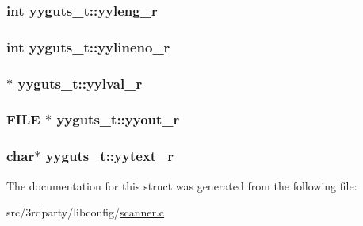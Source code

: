 \label{structyyguts__t_a21f81ca100b12364a5095a37d1c6f650}
\hypertarget{structyyguts__t_aba739bc731f0e9cbb0b6bdfca7930ebd}{
\subsubsection[{yyleng\_\-r}]{\setlength{\rightskip}{0pt plus 5cm}int {\bf yyguts\_\-t::yyleng\_\-r}}}
\label{structyyguts__t_aba739bc731f0e9cbb0b6bdfca7930ebd}
\hypertarget{structyyguts__t_aa9f13776b8d311e847cc7d974d49af4c}{
\subsubsection[{yylineno\_\-r}]{\setlength{\rightskip}{0pt plus 5cm}int {\bf yyguts\_\-t::yylineno\_\-r}}}
\label{structyyguts__t_aa9f13776b8d311e847cc7d974d49af4c}
\hypertarget{structyyguts__t_a55dbdcd46a36d34adcbfc29be44d10cf}{
\subsubsection[{yylval\_\-r}]{$\ast$ {\bf yyguts\_\-t::yylval\_\-r}}}
\label{structyyguts__t_a55dbdcd46a36d34adcbfc29be44d10cf}
\hypertarget{structyyguts__t_a436368a905aaf12e809e265749c74031}{
\subsubsection[{yyout\_\-r}]{\setlength{\rightskip}{0pt plus 5cm}FILE $\ast$ {\bf yyguts\_\-t::yyout\_\-r}}}
\label{structyyguts__t_a436368a905aaf12e809e265749c74031}
\hypertarget{structyyguts__t_aebaa731ad6cbe2411d104925e5bb3f2c}{
\subsubsection[{yytext\_\-r}]{\setlength{\rightskip}{0pt plus 5cm}char$\ast$ {\bf yyguts\_\-t::yytext\_\-r}}}
\label{structyyguts__t_aebaa731ad6cbe2411d104925e5bb3f2c}


The documentation for this struct was generated from the following file:\begin{DoxyCompactItemize}
\item 
src/3rdparty/libconfig/\hyperlink{scanner_8c}{scanner.c}\end{DoxyCompactItemize}
